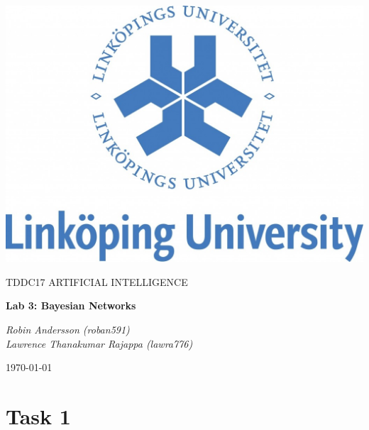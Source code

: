 \documentclass[a4paper,10pt]{article}
\begin{document}
\begin{titlepage}
	\centering
	\includegraphics[width=.6\textwidth]{liu-logo.png}\par
	\vfill
	{\scshape\Large TDDC17 ARTIFICIAL INTELLIGENCE\par}
	{\huge\bfseries Lab 3: Bayesian Networks\par}
	\vspace{1cm}
	{\large\itshape Robin Andersson (roban591) \\ Lawrence Thanakumar Rajappa (lawra776)\par}
	\vfill
	{\large \today\par}
\end{titlepage}

\section*{Task 1}
\end{document}
